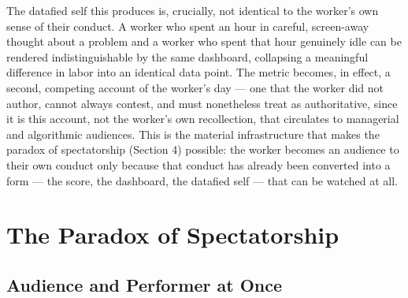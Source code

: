 \documentclass[12pt, a4paper]{article}
\begin{document}
The datafied self this produces is, crucially, not identical to the worker's own sense of their conduct. A worker who spent an hour in careful, screen-away thought about a problem and a worker who spent that hour genuinely idle can be rendered indistinguishable by the same dashboard, collapsing a meaningful difference in labor into an identical data point. The metric becomes, in effect, a second, competing account of the worker's day --- one that the worker did not author, cannot always contest, and must nonetheless treat as authoritative, since it is this account, not the worker's own recollection, that circulates to managerial and algorithmic audiences. This is the material infrastructure that makes the paradox of spectatorship (Section 4) possible: the worker becomes an audience to their own conduct only because that conduct has already been converted into a form --- the score, the dashboard, the datafied self --- that can be watched at all.

\section{The Paradox of Spectatorship}

\subsection{Audience and Performer at Once}
\end{document}
